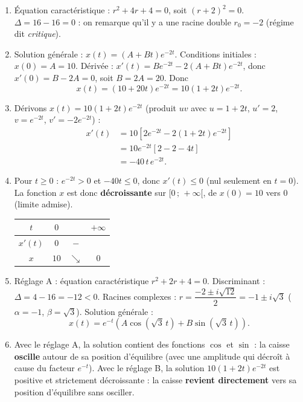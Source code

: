 \documentclass[11pt]{article}
\newcommand{\cle}[1]{{\popxbold\color{popdark}#1}}
\begin{document}
\begin{corrige}
\begin{enumerate}
\item Équation caractéristique : $r^2 + 4r + 4 = 0$, soit $(r + 2)^2 = 0$. $\Delta = 16 - 16 = 0$ : on remarque qu'il y a une \cle{racine double} $r_0 = -2$ (régime dit \emph{critique}).
\item Solution générale : $x(t) = (A + Bt)e^{-2t}$. Conditions initiales : $x(0) = A = 10$. Dérivée : $x'(t) = Be^{-2t} - 2(A + Bt)e^{-2t}$, donc $x'(0) = B - 2A = 0$, soit $B = 2A = 20$. Donc
\[ x(t) = (10 + 20t)e^{-2t} = 10(1 + 2t)e^{-2t}. \]
\item Dérivons $x(t) = 10(1 + 2t)e^{-2t}$ (produit $uv$ avec $u = 1 + 2t$, $u' = 2$, $v = e^{-2t}$, $v' = -2e^{-2t}$) :
\begin{align*}
x'(t) &= 10\left[2e^{-2t} - 2(1 + 2t)e^{-2t}\right] \\
&= 10e^{-2t}\left[2 - 2 - 4t\right] \\
&= -40\,t\,e^{-2t}.
\end{align*}
\item Pour $t \geq 0$ : $e^{-2t} > 0$ et $-40t \leq 0$, donc $x'(t) \leq 0$ (nul seulement en $t = 0$). La fonction $x$ est donc \textbf{décroissante} sur $[0\,;\,+\infty[$, de $x(0) = 10$ vers $0$ (limite admise).
\begin{center}
\begin{tabular}{|c|ccc|}\hline
$t$ & $0$ & & $+\infty$ \\ \hline
$x'(t)$ & $0$ & $-$ & \\ \hline
$x$ & $10$ & $\searrow$ & $0$ \\ \hline
\end{tabular}
\end{center}
\item Réglage A : équation caractéristique $r^2 + 2r + 4 = 0$. Discriminant : $\Delta = 4 - 16 = -12 < 0$. Racines complexes : $r = \dfrac{-2 \pm i\sqrt{12}}{2} = -1 \pm i\sqrt{3}$ ($\alpha = -1$, $\beta = \sqrt{3}$). Solution générale :
\[ x(t) = e^{-t}\left(A\cos(\sqrt{3}\,t) + B\sin(\sqrt{3}\,t)\right). \]
\item Avec le réglage A, la solution contient des fonctions $\cos$ et $\sin$ : la caisse \textbf{oscille} autour de sa position d'équilibre (avec une amplitude qui décroît à cause du facteur $e^{-t}$). Avec le réglage B, la solution $10(1 + 2t)e^{-2t}$ est positive et strictement décroissante : la caisse \textbf{revient directement} vers sa position d'équilibre sans osciller.


\end{enumerate}
\end{corrige}
\end{document}

